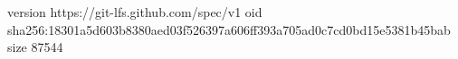 version https://git-lfs.github.com/spec/v1
oid sha256:18301a5d603b8380aed03f526397a606ff393a705ad0c7cd0bd15e5381b45bab
size 87544
